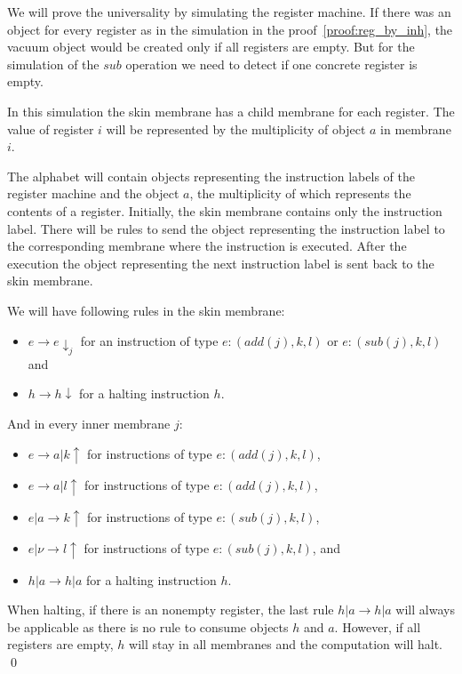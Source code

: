 \begin{dokaz}
  We will prove the universality by simulating the  register machine. If there was an object for every register as in the simulation in the proof~\ref{proof:reg_by_inh}, the vacuum object would be created only if all registers are empty. But for the simulation of the $sub$ operation we need to detect if one concrete register is empty.
  
  In this simulation the skin membrane has a child membrane for each register. The value of register $i$ will be represented by the multiplicity of object $a$ in membrane $i$.
  
  The alphabet will contain objects representing the instruction labels of the register machine and the object $a$, the multiplicity of which represents the contents of a register. Initially, the skin membrane contains only the instruction label. There will be rules to send the object representing the instruction label to the corresponding membrane where the instruction is executed. After the execution the object representing the next instruction label is sent back to the skin membrane.
  
  We will have following rules in the skin membrane:
  
  \begin{itemize}
    \item $e \rightarrow e\downarrow_j$ for an instruction of type $e : (add(j), k, l)$ or $e : (sub(j), k, l)$ and
    \item $h \rightarrow h\downarrow$ for a halting instruction $h$.
  \end{itemize}
  
  And in every inner membrane $j$:
  
  \begin{itemize}
    \item $e \rightarrow a|k\uparrow$ for instructions of type $e : (add(j), k, l)$,
    \item $e \rightarrow a|l\uparrow$ for instructions of type $e : (add(j), k, l)$,
    \item $e|a \rightarrow k\uparrow$ for instructions of type $e : (sub(j), k, l)$,
    \item $e|\nu \rightarrow l\uparrow$ for instructions of type $e : (sub(j), k, l)$, and
    \item $h|a \rightarrow h|a$ for a halting instruction $h$.
  \end{itemize}

  When halting, if there is an nonempty register, the last rule $h|a \rightarrow h|a$ will always be applicable as there is no rule to consume objects $h$ and $a$. However, if all registers are empty, $h$ will stay in all membranes and the computation will halt. \qed  
\end{dokaz}
